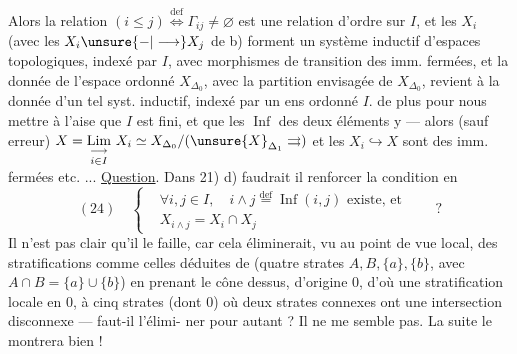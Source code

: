 Alors la relation $(i\leq j)\overset{\mathrm{def}}{\Longleftrightarrow}\Gamma_{ij}\ne\varnothing$ est une
relation d'ordre sur $I$,  et les $X_i$
(avec les $X_i\unsure{-|\longrightarrow}X_j$ de b) forment un
système inductif d'espaces topologiques,
indexé par $I$, avec morphismes de
transition des imm. fermées, et
la donnée de l'espace  ordonné $X_{\Delta_0}$,
 avec la partition envisagée de $X_{\Delta_0}$,
revient à la donnée d'un tel syst.
inductif, indexé par un ens ordonné $I$.
 de plus pour nous mettre
à l'aise que $I$ est fini, et que les
$\operatorname{Inf}$ des deux éléments y  --- alors
(sauf erreur) $X=\underset{i\in I}{\underset{\longrightarrow}{\mathrm{Lim}}}\ X_i\simeq
X_{\Delta_0}/(\unsure{X}_{\Delta_1}\rightrightarrows)$
et les $X_i\hookrightarrow X$ sont des imm. fermées
etc. ...
\uline{Question}. Dans 21) d) faudrait il
renforcer la condition en
\[
(24)\quad\left\{\begin{aligned}
&\forall i,j\in I,\quad i\wedge j\overset{\mathrm{def}}{=}\operatorname{Inf}(i,j)\text{ existe, et}\\
&X_{i\wedge j}=X_i\cap X_j
\end{aligned}\right.\qquad ?
\]
Il n'est pas clair qu'il le faille, car
cela éliminerait, vu au point de vue local,
des stratifications comme celles déduites de 
(quatre strates $A,B,\{a\},\{b\}$, avec
$A\cap B=\{a\}\cup\{b\}$) en prenant le
cône dessus,  d'origine $0$,
d'où une stratification locale en $0$, à cinq
strates (dont $0$) où deux strates connexes ont
une intersection disconnexe --- faut-il l'élimi-
ner pour autant ? Il  ne me
semble pas. La suite le montrera bien !


